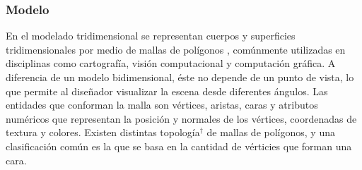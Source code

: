 \subsubsection{Modelo}
En el modelado tridimensional se representan cuerpos y superficies tridimensionales por medio de mallas de polígonos \cite{Mesh_building}, comúnmente utilizadas en disciplinas como cartografía, visión computacional y computación gráfica. A diferencia de un modelo bidimensional, éste no depende de un punto de vista, lo que permite al diseñador visualizar la escena desde diferentes ángulos. Las entidades que conforman la malla son vértices, aristas, caras y atributos numéricos que representan la posición y normales de los vértices, coordenadas de textura y colores. Existen distintas topología$^\dagger$ de mallas de polígonos, y una clasificación común es la que se basa en la cantidad de vérticies que forman una cara.

